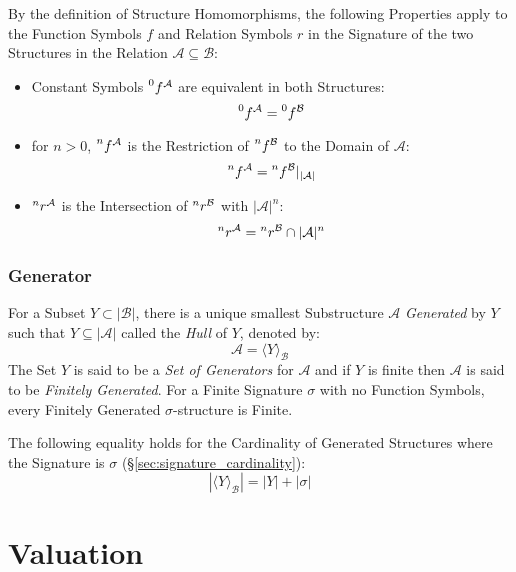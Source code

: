 By the definition of Structure Homomorphisms, the following Properties
apply to the Function Symbols $f$ and Relation Symbols $r$ in the
Signature of the two Structures in the Relation $\mathcal{A} \subseteq
\mathcal{B}$:
\begin{itemize}
    \item Constant Symbols $\prescript{0}{}{f}^\mathcal{A}$ are
      equivalent in both Structures:
\[
    \prescript{0}{}{f}^\mathcal{A} = \prescript{0}{}{f}^\mathcal{B}
\]
    \item for $n >0$, $\prescript{n}{}{f}^\mathcal{A}$ is the
      Restriction of $\prescript{n}{}{f}^\mathcal{B}$ to the Domain of
      $\mathcal{A}$:
\[
    \prescript{n}{}{f}^\mathcal{A}
    = \prescript{n}{}{f}^\mathcal{B} |_{|\mathcal{A}|}
\]
    \item $\prescript{n}{}{r}^\mathcal{A}$ is the Intersection of
      $\prescript{n}{}{r}^\mathcal{B}$ with $|\mathcal{A}|^n$:
\[
    \prescript{n}{}{r}^\mathcal{A}
    = \prescript{n}{}{r}^\mathcal{B} \cap |\mathcal{A}|^n
\]
\end{itemize}



\subsubsection{Generator} \label{sec:generator}

For a Subset $Y \subset |\mathcal{B}|$, there is a unique smallest
Substructure $\mathcal{A}$ \emph{Generated} by $Y$ such that $Y
\subseteq |\mathcal{A}|$ called the \emph{Hull} of $Y$, denoted by:
\[
    \mathcal{A} = \langle Y \rangle_\mathcal{B}
\]
The Set $Y$ is said to be a \emph{Set of Generators} for $\mathcal{A}$
and if $Y$ is finite then $\mathcal{A}$ is said to be \emph{Finitely
  Generated}. For a Finite Signature $\sigma$ with no Function
Symbols, every Finitely Generated $\sigma$-structure is Finite.

The following equality holds for the Cardinality of Generated
Structures where the Signature is $\sigma$
(\S\ref{sec:signature_cardinality}):
\[
  |\langle Y \rangle_\mathcal{B}| = |Y| + |\sigma|
\]



\section{Valuation}\label{sec:valuation}



